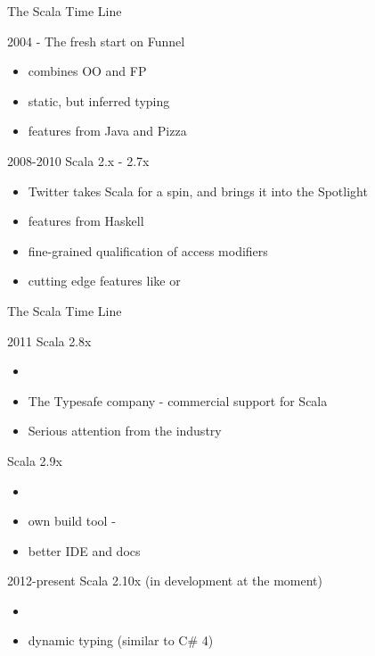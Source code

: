 \begin{frame}{The Scala Time Line}
\begin{block}{2004}
 - The fresh start on Funnel
\begin{itemize}
  \item combines OO and FP
  \item static, but inferred typing
  \item features from Java and Pizza
\end{itemize}
\end{block}
\pause
\begin{block}{2008-2010}
Scala 2.x - 2.7x
\begin{itemize}
  \item Twitter takes Scala for a spin, and brings it into the Spotlight
  \item features from Haskell
  \item fine-grained qualification of access modifiers
  \item cutting edge features like  or
\end{itemize}
\end{block}
\end{frame}

\begin{frame}{The Scala Time Line}
\begin{block}{2011}
Scala 2.8x
\begin{itemize}
  \item {}
  \item The Typesafe company - commercial support for Scala
  \item Serious attention from the industry
\end{itemize}
Scala 2.9x
\begin{itemize}
  \item {}
  \item own build tool - 
  \item better IDE and docs
\end{itemize}
\end{block}
\pause
\begin{block}{2012-present}
Scala 2.10x (in development at the moment)
\begin{itemize}
  \item {}
  \item dynamic typing (similar to C\# 4)
\end{itemize}
\end{block}
\end{frame}

